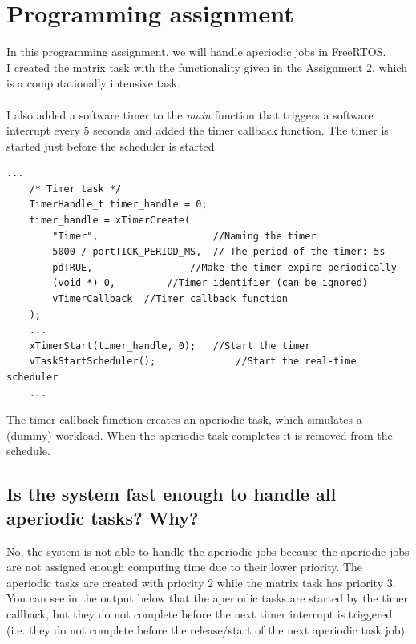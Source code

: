 \documentclass[a4paper]{article}
\begin{document}
\section{Programming assignment}

In this programming assignment, we will handle aperiodic jobs in FreeRTOS. \\
I created the matrix task with the functionality given in the Assignment 2, which is a computationally intensive task. \\
\\
I also added a software timer to the \textit{main} function that triggers a software interrupt every $5$ seconds and added the timer callback function.  The timer is started just before the scheduler is started. \\

\begin{lstlisting}[label=Software timer,caption=Definition and start of the software timer]
	...
	/* Timer task */
	TimerHandle_t timer_handle = 0;
	timer_handle = xTimerCreate(
    	"Timer",					//Naming the timer
        5000 / portTICK_PERIOD_MS,	// The period of the timer: 5s
        pdTRUE,					//Make the timer expire periodically
        (void *) 0,			//Timer identifier (can be ignored)
        vTimerCallback	//Timer callback function
	);
    ...
	xTimerStart(timer_handle, 0);	//Start the timer
	vTaskStartScheduler();				//Start the real-time scheduler
    ...
\end{lstlisting}

The timer callback function creates an aperiodic task, which simulates a (dummy) workload. When the aperiodic task completes it is removed from the schedule. \\

\subsection{Is the system fast enough to handle all aperiodic tasks? Why?}

No, the system is not able to handle the aperiodic jobs because the aperiodic jobs are not assigned enough computing time due to their lower priority. The aperiodic tasks are created with priority $2$ while the matrix task has priority $3$. \\
You can see in the output below that the aperiodic tasks are started by the timer callback, but they do not complete before the next timer interrupt is triggered (i.e. they do not complete before the release/start of the next aperiodic task job). \\
\end{document}
